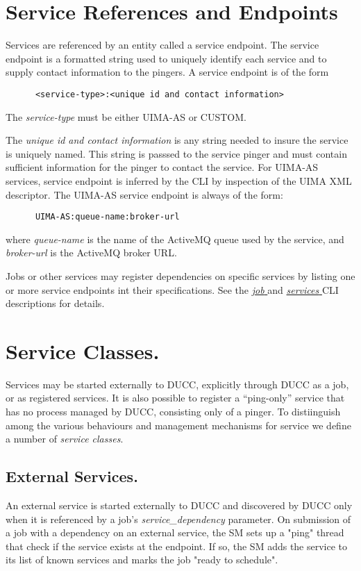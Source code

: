       \section{Service References and Endpoints} 
      \label{sec:service.endpoints}
      Services are referenced by an entity called a service
      endpoint. The service endpoint is a formatted string used to uniquely identify each
      service and to supply contact information to the pingers.  A service endpoint
      is of the form 
\begin{verbatim}
      <service-type>:<unique id and contact information>
\end{verbatim}
      
      The {\em service-type} must be either UIMA-AS or CUSTOM.
      
      The {\em unique id and contact information} is any string needed to insure the service is
      uniquely named.  This string is passsed to the service pinger and must contain sufficient
      information for the pinger to contact the service.  For UIMA-AS services, service endpoint is
      inferred by the CLI by inspection of the UIMA XML descriptor.  The UIMA-AS
      service endpoint is always of the form:
\begin{verbatim}
      UIMA-AS:queue-name:broker-url
\end{verbatim}
      where {\em queue-name} is the name of the ActiveMQ queue used by the service, and {\em broker-url}
      is the ActiveMQ broker URL.

      Jobs or other services may register dependencies on specific services by listing one or more
      service endpoints int their specifications. See the 
      \hyperref[sec:cli.ducc-submit]{\em job } and 
      \hyperref[sec:cli.ducc-services]{\em services } CLI descriptions for details.
      
      
      \section{Service Classes.} 
      \label{sec:service.classes}
      Services may be started externally to DUCC, explicitly through
      DUCC as a job, or as registered services.  It is also possible to register a ``ping-only''
      service that has no process managed by DUCC, consisting only of a pinger.  To distiinguish
      among the various behaviours and management mechanisms for service we define a number
      of {\em service classes}.

      \subsection{External Services.} 
      \label{sec:services.external}
      An external service is started externally to DUCC and discovered by DUCC only when it is
      referenced by a job's {\em service\_dependency} parameter. On
      submission of a job with a dependency on an external service, the SM sets up a "ping" thread
      that check if the service exists at the endpoint. If so, the SM adds the service to its list
      of known services and marks the job "ready to schedule".

